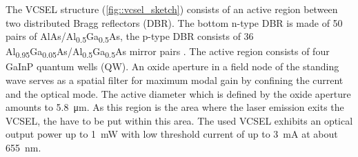	The VCSEL structure (\autoref{fig::vcsel_sketch}) consists of an active region between two distributed Bragg reflectors (DBR). 
	The bottom n-type DBR is made of 50 pairs of AlAs/Al\textsubscript{0.5}Ga\textsubscript{0.5}As, the p-type DBR consists of 36 Al\textsubscript{0.95}Ga\textsubscript{0.05}As/Al\textsubscript{0.5}Ga\textsubscript{0.5}As mirror pairs \cite{Weidenfeld2012}. 
	The active region consists of four GaInP quantum wells (QW). 
	An oxide aperture in a field node of the standing wave serves as a spatial filter for maximum modal gain by confining the current and the optical mode.
	The active diameter which is defined by the oxide aperture amounts to \SI{5.8}{\micro\meter}.
	As this region is the area where the laser emission exits the VCSEL, the \nds have to be put within this area.
	The used VCSEL exhibits an optical output power up to \SI{1}{\milli\watt} with low threshold current of up to \SI{3}{\milli\ampere} at about \SI{655}{nm}. 

